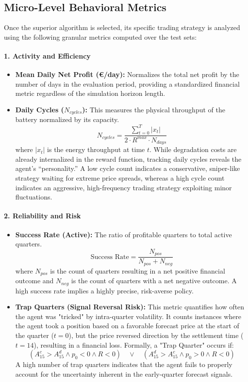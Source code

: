 \subsection{Micro-Level Behavioral Metrics}
Once the superior algorithm is selected, its specific trading strategy is analyzed using the following granular metrics computed over the test sets:

\paragraph{1. Activity and Efficiency}
\begin{itemize}
    \item \textbf{Mean Daily Net Profit (€/day):} Normalizes the total net profit by the number of days in the evaluation period, providing a standardized financial metric regardless of the simulation horizon length.
    \item \textbf{Daily Cycles ($N_{cycles}$):} This measures the physical throughput of the battery normalized by its capacity.
    \[
        N_{cycles} = \frac{\sum_{t=0}^{T} |x_t|}{2 \cdot R^{max} \cdot N_{days}}
    \]
    where $|x_t|$ is the energy throughput at time $t$. While degradation costs are already internalized in the reward function, tracking daily cycles reveals the agent's ``personality.'' A low cycle count indicates a conservative, sniper-like strategy waiting for extreme price spreads, whereas a high cycle count indicates an aggressive, high-frequency trading strategy exploiting minor fluctuations.
\end{itemize}

\paragraph{2. Reliability and Risk}
\begin{itemize}
    \item \textbf{Success Rate (Active):} The ratio of profitable quarters to total active quarters.
    \[
        \text{Success Rate} = \frac{N_{pos}}{N_{pos} + N_{neg}}
    \]
    where $N_{pos}$ is the count of quarters resulting in a net positive financial outcome and $N_{neg}$ is the count of quarters with a net negative outcome. A high success rate implies a highly precise, risk-averse policy.
    
    \item \textbf{Trap Quarters (Signal Reversal Risk):} This metric quantifies how often the agent was "tricked" by intra-quarter volatility. It counts instances where the agent took a position based on a favorable forecast price at the start of the quarter ($t=0$), but the price reversed direction by the settlement time ($t=14$), resulting in a financial loss. Formally, a "Trap Quarter" occurs if:
    \[
        (A^c_{15} > A^d_{15} \land p_0 < 0 \land R < 0) \quad \lor \quad (A^d_{15} > A^c_{15} \land p_0 > 0 \land R < 0)
    \]
    A high number of trap quarters indicates that the agent fails to properly account for the uncertainty inherent in the early-quarter forecast signals.
\end{itemize}

